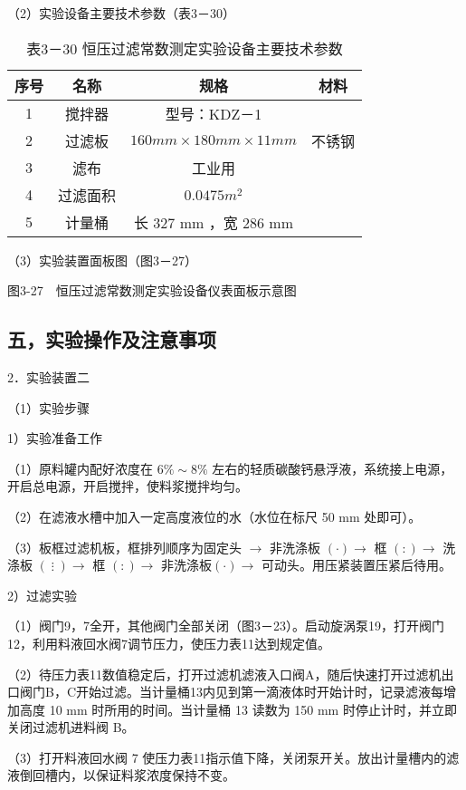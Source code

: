 \documentclass[
]{article}
\begin{document}
（2）实验设备主要技术参数（表3－30）
\begin{table}[h]
    \centering
    \caption{表3－30 恒压过滤常数测定实验设备主要技术参数}
    \begin{tabular}{c|c|c|c}
    \hline 序号 & 名称 & 规格 & 材料 \\
    \hline 1 & 搅拌器 & 型号：KDZ－1 & \\
    \hline 2 & 过滤板 & $160 mm \times 180 mm \times 11 mm$ & 不锈钢 \\
    \hline 3 & 滤布 & 工业用 & \\
    \hline 4 & 过滤面积 & $0.0475 m^2$ & \\
    \hline 5 & 计量桶 & 长 327 mm ，宽 286 mm & \\
    \hline
    \end{tabular}
\end{table}

（3）实验装置面板图（图3－27）

图3-27　恒压过滤常数测定实验设备仪表面板示意图

\subsection{五，实验操作及注意事项}

2．实验装置二

（1）实验步骤

1）实验准备工作

（1）原料罐内配好浓度在 $6\% \sim 8\%$ 左右的轻质碳酸钙悬浮液，系统接上电源，开启总电源，开启搅拌，使料浆搅拌均匀。

（2）在滤液水槽中加入一定高度液位的水（水位在标尺 50 mm 处即可）。

（3）板框过滤机板，框排列顺序为固定头 $\rightarrow$ 非洗涤板 $(\cdot) 
\rightarrow$ 框 $(:) \rightarrow$ 洗涤板 $(⋮)\rightarrow$ 框 $(:) \rightarrow$ 非洗涤板$(\cdot)$$\rightarrow$ 可动头。用压紧装置压紧后待用。

2）过滤实验

（1）阀门9，7全开，其他阀门全部关闭（图3－23）。启动旋涡泵19，打开阀门12，利用料液回水阀7调节压力，使压力表11达到规定值。

（2）待压力表11数值稳定后，打开过滤机滤液入口阀A，随后快速打开过滤机出口阀门B，C开始过滤。当计量桶13内见到第一滴液体时开始计时，记录滤液每增加高度 10 mm 时所用的时间。当计量桶 13 读数为 150 mm 时停止计时，并立即关闭过滤机进料阀 B。

（3）打开料液回水阀 7 使压力表11指示值下降，关闭泵开关。放出计量槽内的滤液倒回槽内，以保证料浆浓度保持不变。
\end{document}
